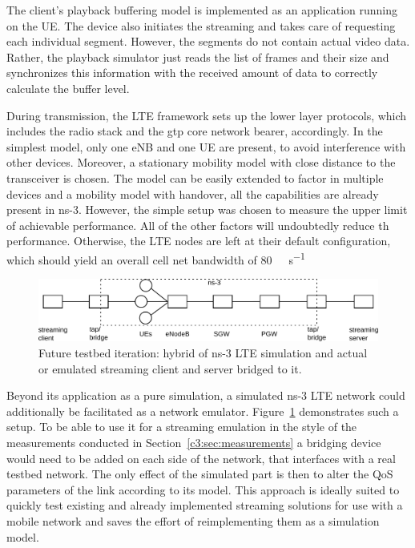 The client's playback buffering model is implemented as an application running on the \gls{UE}. The device also initiates the streaming and takes care of requesting each individual segment. However, the segments do not contain actual video data. Rather, the playback simulator just reads the list of frames and their size and synchronizes this information with the received amount of data to correctly calculate the buffer level.

During transmission, the \gls{LTE} framework sets up the lower layer protocols, which includes the radio stack and the \gls{gtp} core network bearer, accordingly. In the simplest model, only one \gls{eNB} and one \gls{UE} are present, to avoid interference with other devices. Moreover, a stationary mobility model with close distance to the transceiver is chosen. The model can be easily extended to factor in multiple devices and a mobility model with handover, all the capabilities are already present in ns-3. However, the simple setup was chosen to measure the upper limit of achievable performance. All of the other factors will undoubtedly reduce th performance. Otherwise, the \gls{LTE} nodes are left at their default configuration, which should yield an overall cell net bandwidth of \SI{80}{\mega\bit\per\second}

\begin{figure}[htb]
\centering
\includegraphics[width=\textwidth]{images/streaming-hybrid.pdf}
\caption{Future testbed iteration: hybrid of ns-3 LTE simulation and actual or emulated streaming client and server bridged to it.}
\label{c5:fig:streaming-hybrid}
\end{figure}

Beyond its application as a pure simulation, a simulated ns-3 \gls{LTE} network could additionally be facilitated as a network emulator. Figure~\ref{c5:fig:streaming-hybrid} demonstrates such a setup. To be able to use it for a streaming emulation in the style of the measurements conducted in Section~\ref{c3:sec:measurements} a bridging device would need to be added on each side of the network, that interfaces with a real testbed network. The only effect of the simulated part is then to alter the \gls{QoS} parameters of the link according to its model. This approach is ideally suited to quickly test existing and already implemented streaming solutions for use with a mobile network and saves the effort of reimplementing them as a simulation model.


